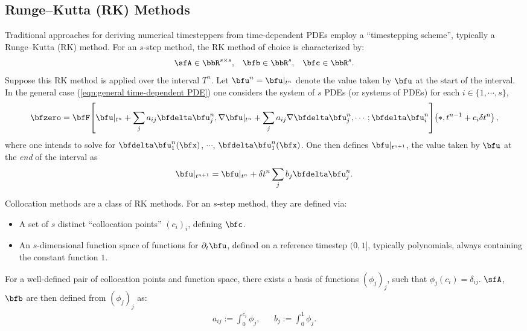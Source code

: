 \subsection*{Runge--Kutta (RK) Methods}\label{cha:RK methods}
    Traditional approaches for deriving numerical timesteppers from time-dependent PDEs employ a ``timestepping scheme'', typically a Runge--Kutta (RK) method. For an $s$-step method, the RK method of choice is characterized by:
    \begin{align}
        \sfA  \in  \bbR^{s \times s},  &&
        \bfb  \in  \bbR^{s},  &&
        \bfc  \in  \bbR^{s}.
    \end{align}
    Suppose this RK method is applied over the interval $T^{n}$. Let $\bfu^{n}  =  \bfu|_{t^{n}}$ denote the value taken by $\bfu$ at the start of the interval. In the general case (\ref{eqn:general time-dependent PDE}) one considers the system of $s$ PDEs (or systems of PDEs) for each $i  \in  \{1, \cdots, s\}$, 
    \begin{equation}
        \bfzero  =  \bfF\!\left[\bfu|_{t^{n}} + \sum_{j}a_{ij}\bfdelta\bfu^{n}_{j}, \nabla\bfu|_{t^{n}} + \sum_{j}a_{ij}\nabla\bfdelta\bfu^{n}_{j}, \cdots; \bfdelta\bfu^{n}_{i}\right]\!\left(*, t^{n - 1} + c_{i}\delta t^{n}\right),
    \end{equation}
    where one intends to solve for $\bfdelta\bfu^{n}_{1}(\bfx)$, $\cdots$, $\bfdelta\bfu^{n}_{1}(\bfx)$. One then defines $\bfu|_{t^{n + 1}}$, the value taken by $\bfu$ at the \emph{end} of the interval as
    \begin{equation}
        \bfu|_{t^{n + 1}}  =  \bfu|_{t^{n}} + \delta t^{n}\sum_{j}b_{j}\bfdelta\bfu^{n}_{j}.
    \end{equation}

    \line
    
    \begin{definition}
        Collocation methods are a class of RK methods. For an $s$-step method, they are defined via:
        \begin{itemize}
            \item  A set of $s$ distinct ``collocation points'' $(c_{i})_{i}$, defining $\bfc$.
            \item  An $s$-dimensional function space of functions for $\partial_{t}\bfu$, defined on a reference timestep $(0, 1]$, typically polynomials, always containing the constant function $1$.
        \end{itemize}
        For a well-defined pair of collocation points and function space, there exists a basis of functions $(\phi_{j})_{j}$, such that $\phi_{j}(c_{i})  =  \delta_{ij}$. $\sfA$, $\bfb$ are then defined from $(\phi_{j})_{j}$ as:
        \begin{align}
            a_{ij}  :=  \int_{0}^{c_{i}}\phi_{j},  &&
            b_{j}   :=  \int_{0}^{1}\phi_{j}.
        \end{align}
    \end{definition}
    
